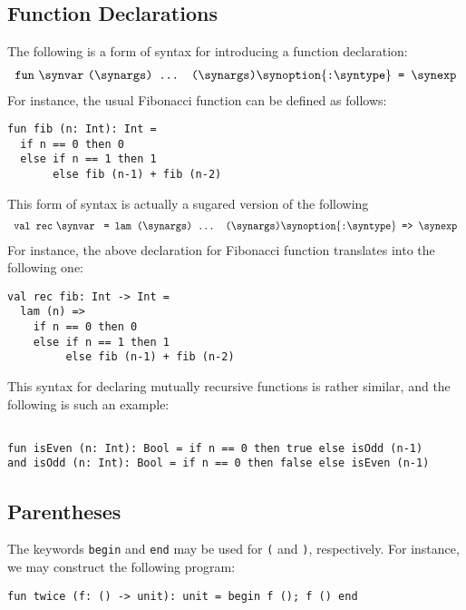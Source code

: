 \subsection{Function Declarations}
The following is a form of syntax for introducing a function declaration:
\[\begin{array}{c}
\texttt{fun}~\synvar~\texttt{(}\synargs\texttt{) ... (}\synargs\texttt{)}\synoption{\texttt{:}\syntype}\texttt{ = }\synexp
\end{array}\]
For instance, the usual Fibonacci function can be defined as follows:
\begin{verbatim}
fun fib (n: Int): Int =
  if n == 0 then 0
  else if n == 1 then 1
       else fib (n-1) + fib (n-2)
\end{verbatim}
This form of syntax is actually a sugared version of the following
\[\begin{array}{c}
\texttt{val rec}~\synvar~\texttt{ = lam (}\synargs\texttt{) ... (}\synargs\texttt{)}\synoption{\texttt{:}\syntype}\texttt{ => }\synexp
\end{array}\]
For instance, the above declaration for Fibonacci function translates into
the following one:
\begin{verbatim}
val rec fib: Int -> Int =
  lam (n) =>
    if n == 0 then 0
    else if n == 1 then 1
         else fib (n-1) + fib (n-2)
\end{verbatim}
This syntax for declaring mutually recursive functions is rather similar,
and the following is such an example:
\begin{verbatim}

fun isEven (n: Int): Bool = if n == 0 then true else isOdd (n-1)
and isOdd (n: Int): Bool = if n == 0 then false else isEven (n-1)
\end{verbatim}

\subsection{Parentheses}
The keywords \texttt{begin} and \texttt{end} may be used for \texttt{(} and
\texttt{)}, respectively. For instance, we may construct the following
program:
\begin{verbatim}
fun twice (f: () -> unit): unit = begin f (); f () end
\end{verbatim}

